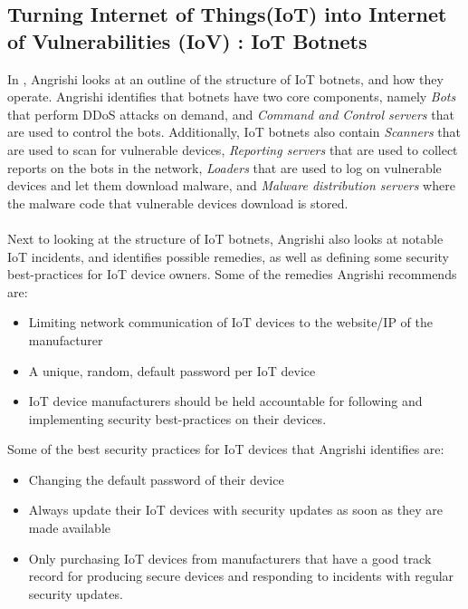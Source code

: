 \documentclass[a4paper,10pt]{article}
\begin{document}
\subsection{Turning Internet of Things(IoT) into Internet of Vulnerabilities (IoV) : IoT Botnets} \label{sec:literature_review:angrishi2017}
In \cite{angrishi2017turning}, Angrishi looks at an outline of the structure of IoT botnets, and how they operate. Angrishi
identifies that botnets have two core components, namely \textit{Bots} that perform DDoS attacks on demand, and
\textit{Command and Control servers} that are used to control the bots. Additionally, IoT botnets also contain 
\textit{Scanners} that are used to scan for vulnerable devices, \textit{Reporting servers} that are used to collect reports
on the bots in the network, \textit{Loaders} that are used to log on vulnerable devices and let them download malware,
and \textit{Malware distribution servers} where the malware code that vulnerable devices download is stored.
\\\\
Next to looking at the structure of IoT botnets, Angrishi also looks at notable IoT incidents, and identifies possible
remedies, as well as defining some security best-practices for IoT device owners.  Some of the remedies Angrishi 
recommends are:
\begin{itemize}
 \item Limiting network communication of IoT devices to the website/IP of the manufacturer
 \item A unique, random, default password per IoT device
 \item IoT device manufacturers should be held accountable for following and implementing security best-practices
 on their devices.
\end{itemize}

\noindent Some of the best security practices for IoT devices that Angrishi identifies are:
\begin{itemize}
 \item Changing the default password of their device
 \item Always update their IoT devices with security updates as soon as they are made available
 \item Only purchasing IoT devices from manufacturers that have a good track record for producing secure
 devices and responding to incidents with regular security updates.
\end{itemize}
\end{document}
